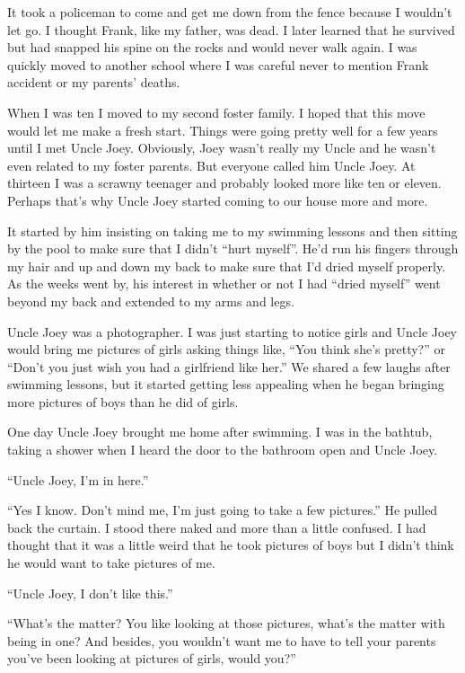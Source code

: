 \documentclass[11pt,letterpaper]{article}
\begin{document}
It took a policeman to come and get me down from the fence because I wouldn't let go. I thought Frank, like my father, was dead. I later learned that he survived but had snapped his spine on the rocks and would never walk again. I was quickly moved to another school where I was careful never to mention Frank accident or my parents' deaths.


When I was ten I moved to my second foster family. I hoped that this move would let me make a fresh start. Things were going pretty well for a few years until I met Uncle Joey. Obviously, Joey wasn't really my Uncle and he wasn't even related to my foster parents. But everyone called him Uncle Joey. At thirteen I was a scrawny teenager and probably looked more like ten or eleven. Perhaps that's why Uncle Joey started coming to our house more and more.

It started by him insisting on taking me to my swimming lessons and then sitting by the pool to make sure that I didn't ``hurt myself''. He'd run his fingers through my hair and up and down my back to make sure that I'd dried myself properly. As the weeks went by, his interest in whether or not I had ``dried myself'' went beyond my back and extended to my arms and legs.

Uncle Joey was a photographer. I was just starting to notice girls and Uncle Joey would bring me pictures of girls asking things like, ``You think she's pretty?'' or ``Don't you just wish you had a girlfriend like her.'' We shared a few laughs after swimming lessons, but it started getting less appealing when he began bringing more pictures of boys than he did of girls.

One day Uncle Joey brought me home after swimming. I was in the bathtub, taking a shower when I heard the door to the bathroom open and Uncle Joey.

``Uncle Joey, I'm in here.''

``Yes I know. Don't mind me, I'm just going to take a few pictures.'' He pulled back the curtain. I stood there naked and more than a little confused. I had thought that it was a little weird that he took pictures of boys but I didn't think he would want to take pictures of me.

``Uncle Joey, I don't like this.''

``What's the matter? You like looking at those pictures, what's the matter with being in one? And besides, you wouldn't want me to have to tell your parents you've been looking at pictures of girls, would  you?''
\end{document}
